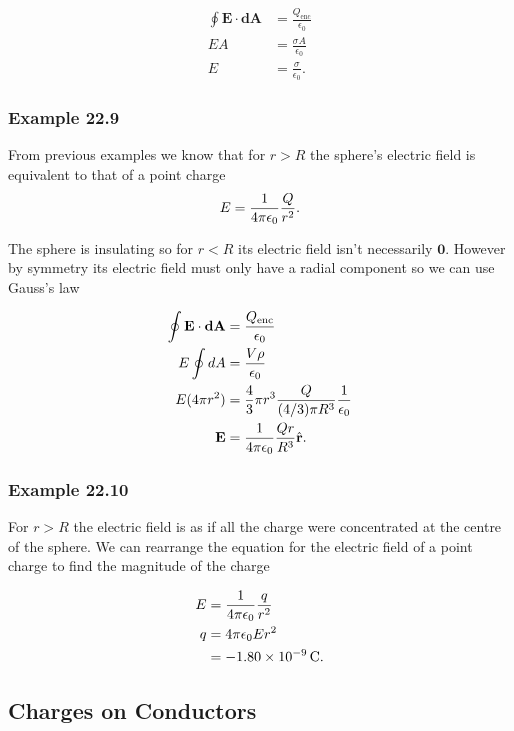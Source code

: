 \documentclass{article}
\begin{document}
\begin{align*}
  \oint \mathbf{E} \cdot \mathbf{dA} & = \frac{Q_\textrm{enc}}{\epsilon_0} \\
  E A                                & = \frac{\sigma A}{\epsilon_0}       \\
  E                                  & = \frac{\sigma}{\epsilon_0}.
\end{align*}

\subsubsection{Example 22.9}

From previous examples we know that for $r > R$ the sphere's electric field is equivalent to that of a point charge \[E = \frac{1}{4 \pi \epsilon_0} \frac{Q}{r^2}.\]

The sphere is insulating so for $r < R$ its electric field isn't necessarily $\mathbf{0}$. However by symmetry its electric field must only have a radial component so we can use Gauss's law

\begin{align*}
  \oint \mathbf{E} \cdot \mathbf{dA} & = \frac{Q_\textrm{enc}}{\epsilon_0}                                \\
  E \oint dA                         & = \frac{V \rho}{\epsilon_0}                                        \\
  E (4 \pi r^2)                      & = \frac{4}{3} \pi r^3 \frac{Q}{(4/3) \pi R^3} \frac{1}{\epsilon_0} \\
  \mathbf{E}                         & = \frac{1}{4 \pi \epsilon_0} \frac{Q r}{R^3} \hat{\mathbf{r}}.
\end{align*}

\subsubsection{Example 22.10}

For $r > R$ the electric field is as if all the charge were concentrated at the centre of the sphere. We can rearrange the equation for the electric field of a point charge to find the magnitude of the charge

\begin{align*}
  E & = \frac{1}{4 \pi \epsilon_0} \frac{q}{r^2}      \\
  q & = 4 \pi \epsilon_0 E r^2 \\
    & = \qty{-1.80e-9}{C}.
\end{align*}

\subsection{Charges on Conductors}
\end{document}
